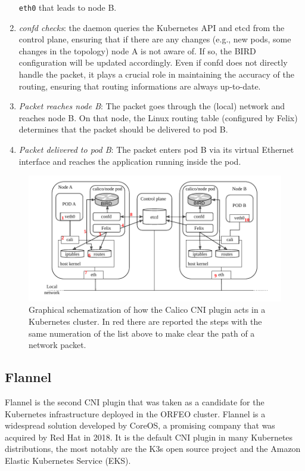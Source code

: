 \begin{enumerate}
    \texttt{eth0} that leads to node B.
  \item \textit{confd checks}: the daemon queries the Kubernetes API and etcd
    from the control plane, ensuring that if there are any changes (e.g., new
    pods, some changes in the topology) node A is not aware of. If so, the BIRD
    configuration will be updated accordingly. Even if confd does not directly
    handle the packet, it plays a crucial role in maintaining the accuracy of
    the routing, ensuring that routing informations are always up-to-date.
  \item \textit{Packet reaches node B}: The packet goes through the (local)
    network and reaches node B. On that node, the Linux routing table
    (configured by Felix) determines that the packet should be delivered to pod
    B.
  \item \textit{Packet delivered to pod B}: The packet enters pod B via its
    virtual Ethernet interface and reaches the application running inside the
    pod.
\end{enumerate}

\begin{figure}
  \centering
  \includegraphics[width=\textwidth]{img/chpt2/CNI-calico}
  \caption{Graphical schematization of how the Calico CNI plugin acts in a
    Kubernetes cluster. In red there are reported the steps with the same
    numeration of the list above to make clear the path of a network packet.}
  \label{fig:cni-calico}
\end{figure}

\subsection{Flannel}\label{subsec:flannel}

Flannel is the second CNI plugin that was taken as a candidate for the
Kubernetes infrastructure deployed in the ORFEO cluster. Flannel is a widespread
solution developed by CoreOS, a promising company that was acquired by Red Hat
in 2018.
It is the default CNI plugin in many Kubernetes distributions, the most notably
are the K3s open source project and the Amazon Elastic Kubernetes Service (EKS).

